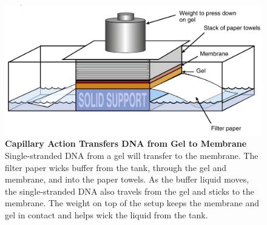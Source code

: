 \documentclass[11pt,dvipsnames,ignorenonframetext,aspectratio=169]{beamer}
\begin{document}
\begin{frame}{}
\protect\hypertarget{section-28}{}
\begin{figure}
\includegraphics[width=0.35\linewidth]{./../images/southern_blotting} \caption{\textbf{Capillary Action Transfers DNA from Gel to Membrane} \newline Single-stranded DNA from a gel will transfer to the membrane. The filter paper wicks buffer from the tank, through the gel and membrane, and into the paper towels. As the buffer liquid moves, the single-stranded DNA also travels from the gel and sticks to the membrane. The weight on top of the setup keeps the membrane and gel in contact and helps wick the liquid from the tank.}\label{fig:southern-blotting}
\end{figure}
\end{frame}
\end{document}
